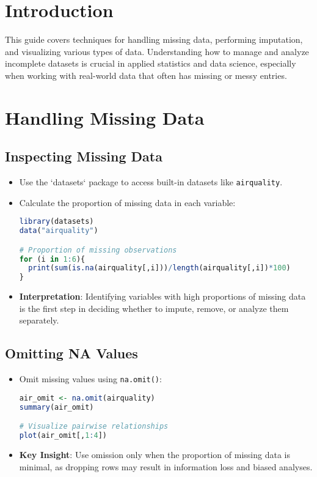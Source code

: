 \section{Introduction}
This guide covers techniques for handling missing data, performing imputation, and visualizing various types of data. Understanding how to manage and analyze incomplete datasets is crucial in applied statistics and data science, especially when working with real-world data that often has missing or messy entries.

\section{Handling Missing Data}
\subsection{Inspecting Missing Data}
\begin{itemize}
    \item Use the `datasets` package to access built-in datasets like \texttt{airquality}.
    \item Calculate the proportion of missing data in each variable:
\begin{lstlisting}[language=R]
library(datasets)
data("airquality")

# Proportion of missing observations
for (i in 1:6){
  print(sum(is.na(airquality[,i]))/length(airquality[,i])*100)
}
\end{lstlisting}

\item \textbf{Interpretation}: Identifying variables with high proportions of missing data is the first step in deciding whether to impute, remove, or analyze them separately.
\end{itemize}

\subsection{Omitting NA Values}
\begin{itemize}
    \item Omit missing values using \texttt{na.omit()}:
\begin{lstlisting}[language=R]
air_omit <- na.omit(airquality)
summary(air_omit)

# Visualize pairwise relationships
plot(air_omit[,1:4])
\end{lstlisting}

\item \textbf{Key Insight}: Use omission only when the proportion of missing data is minimal, as dropping rows may result in information loss and biased analyses.
\end{itemize}

